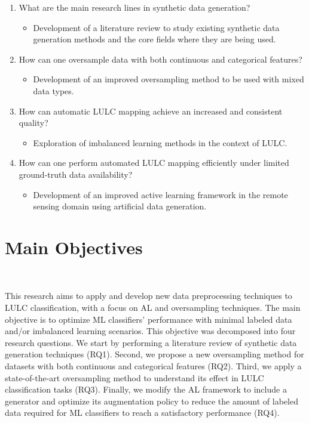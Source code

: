 \begin{enumerate}
    \item What are the main research lines in synthetic data generation?
          \begin{itemize}
              \item Development of a literature review to study existing
                  synthetic data generation methods and the core fields where
                  they are being used.
          \end{itemize}
    \item How can one oversample data with both continuous and categorical
        features? 
        \begin{itemize}
            \item Development of an improved oversampling method to be used
                with mixed data types.
        \end{itemize}
    \item How can automatic LULC mapping achieve an increased and consistent
        quality?
          \begin{itemize}
              \item Exploration of imbalanced learning methods in the context
                  of LULC\@.
          \end{itemize}
    \item How can one perform automated LULC mapping efficiently under limited
        ground-truth data availability?
        \begin{itemize}
            \item Development of an improved active learning framework in the
                remote sensing domain using artificial data generation.
        \end{itemize}
\end{enumerate}

\section{Main Objectives}~\label{sec:main_objectives}

This research aims to apply and develop new data preprocessing techniques to
LULC classification, with a focus on AL and oversampling techniques. The main
objective is to optimize ML classifiers' performance with minimal labeled data
and/or imbalanced learning scenarios. This objective was decomposed into four
research questions. We start by performing a literature review of synthetic
data generation techniques (RQ1). Second, we propose a new oversampling method
for datasets with both continuous and categorical features (RQ2). Third, we
apply a state-of-the-art oversampling method to understand its effect in LULC
classification tasks (RQ3). Finally, we modify the AL framework to include a
generator and optimize its augmentation policy to reduce the amount of labeled
data required for ML classifiers to reach a satisfactory performance (RQ4).


